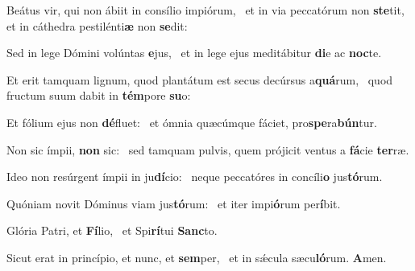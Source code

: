 \item Beátus vir, qui non ábiit in consílio impiórum,~\pscross{} et in via peccatórum non \textbf{ste}tit,~\psstar{} et in cáthedra pestilénti\textbf{æ} non \textbf{se}dit:
\item Sed in lege Dómini volúntas \textbf{e}jus,~\psstar{} et in lege ejus meditábitur \textbf{di}e ac \textbf{noc}te.
\item Et erit tamquam lignum, quod plantátum est secus decúrsus a\textbf{quá}rum,~\psstar{} quod fructum suum dabit in \textbf{tém}pore \textbf{su}o:
\item Et fólium ejus non \textbf{dé}fluet:~\psstar{} et ómnia quæcúmque fáciet, pro\textbf{spe}ra\textbf{bún}tur.
\item Non sic ímpii, \textbf{non} sic:~\psstar{} sed tamquam pulvis, quem prójicit ventus a \textbf{fá}cie \textbf{ter}ræ.
\item Ideo non resúrgent ímpii in ju\textbf{dí}cio:~\psstar{} neque peccatóres in concíli\textbf{o} jus\textbf{tó}rum.
\item Quóniam novit Dóminus viam jus\textbf{tó}rum:~\psstar{} et iter impi\textbf{ó}rum per\textbf{í}bit.
\item Glória Patri, et \textbf{Fí}lio,~\psstar{} et Spi\textbf{rí}tui \textbf{Sanc}to.
\item Sicut erat in princípio, et nunc, et \textbf{sem}per,~\psstar{} et in sǽcula sæcu\textbf{ló}rum. \textbf{A}men.
